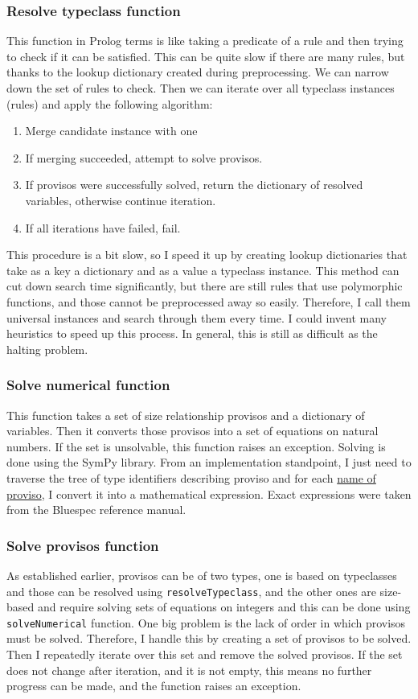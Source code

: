 \documentclass[12pt]{report}
\begin{document}
\subsubsection{Resolve typeclass function}
This function in Prolog terms is like taking a predicate of a rule and then trying to check if it can be satisfied. This can be quite slow if there are many rules, but thanks to the lookup dictionary created during preprocessing. We can narrow down the set of rules to check. 
Then we can iterate over all typeclass instances (rules) and apply the following algorithm: 
\begin{enumerate}  
   \item Merge candidate instance with one  
   \item If merging succeeded, attempt to solve provisos. 
   \item If provisos were successfully solved, return the dictionary of resolved variables, otherwise continue iteration. 
   \item If all iterations have failed, fail. 
\end{enumerate} 
This procedure is a bit slow, so I speed it up by creating lookup dictionaries that take as a key a dictionary and as a value a typeclass instance. This method can cut down search time significantly, but there are still rules that use polymorphic functions, and those cannot be preprocessed away so easily. Therefore, I call them universal instances and search through them every time. I could invent many heuristics to speed up this process. In general, this is still as difficult as the halting problem. 

\subsubsection{Solve numerical function} 

This function takes a set of size relationship provisos and a dictionary of variables. Then it converts those provisos into a set of equations on natural numbers. If the set is unsolvable, this function raises an exception. Solving is done using the SymPy library. 
From an implementation standpoint, I just need to traverse the tree of type identifiers describing proviso and for each \hyperref[sec:Provisos]{name of proviso}, I convert it into a mathematical expression. Exact expressions were taken from the Bluespec reference manual\cite{BscReference}. 
\subsubsection{Solve provisos function} 
As established earlier, provisos can be of two types, one is based on typeclasses and those can be resolved using \verb!resolveTypeclass!, and the other ones are size-based and require solving sets of equations on integers and this can be done using \verb!solveNumerical! function. 
One big problem is the lack of order in which provisos must be solved. Therefore, I handle this by creating a set of provisos to be solved. Then I repeatedly iterate over this set and remove the solved provisos. If the set does not change after iteration, and it is not empty, this means no further progress can be made, and the function raises an exception. 
\end{document}
